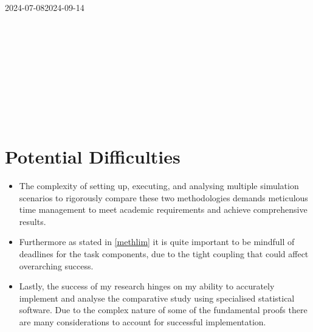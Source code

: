\begin{landscape}
\thispagestyle{empty}
\vspace*{\fill} %
\begin{center}
\begin{ganttchart}[
	time slot format=isodate,
	time slot unit=day,
	x unit=0.35cm,
	y unit title=0.5cm,
	y unit chart=0.7cm,
	hgrid,
	vgrid,
	group right shift=0,
	group top shift=.6,
	group height=.3,
	group peaks tip position=0,
	group peaks height=.2,
	group peaks width=.2,
	title label font=\scriptsize,
	bar label font=\scriptsize,
	milestone label font=\scriptsize,
	]{2024-07-08}{2024-09-14}
	 \\
	
	 \\
	 \\
	 \\
	
	 \\
	 \\
	 \\

	 \\
	 \\
	 \\
	
\end{ganttchart}
\end{center}
\vspace*{\fill}
\end{landscape}
\restoregeometry

\medskip

\section{Potential Difficulties}


\begin{itemize}
	\item The complexity of setting up, executing, and analysing multiple simulation scenarios to rigorously compare these two methodologies demands meticulous time management to meet academic requirements and achieve comprehensive results.
	\item Furthermore as stated in \ref{methlim} it is quite important to be mindfull of deadlines for the task components, due to the tight coupling that could affect overarching success.
	\item Lastly, the success of my research hinges on my ability to accurately implement and analyse the comparative study using specialised statistical software. Due to the complex nature of some of the fundamental proofs there are many considerations to account for successful implementation.
\end{itemize}


